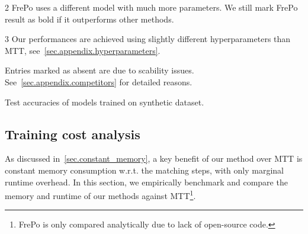 \documentclass[10pt,twocolumn,letterpaper]{article}
\begin{document}
\begin{table}
{\begin{threeparttable}
\begin{tablenotes}
    \item [2]FrePo uses a different model with much more parameters. We still mark FrePo result as bold if it outperforms other methods.
    \item[3] Our performances are achieved using slightly different hyperparameters than MTT, see~\cref{sec.appendix.hyperparameters}.
    \item Entries marked as absent are due to scability issues. See~\cref{sec.appendix.competitors} for detailed reasons.
    \end{tablenotes}
\end{threeparttable}
}
\caption{Test accuracies of models trained on synthetic dataset.}
\label{tab:overall_accuracy}
\end{table}
\subsection{Training cost analysis}
\label{sec.cost}
As discussed in~\cref{sec.constant_memory}, a key benefit of our method over MTT is constant memory consumption w.r.t. the matching steps, with only marginal runtime overhead. In this section, we empirically benchmark and compare the memory and runtime of our methods against MTT\footnote{FrePo is only compared analytically due to lack of open-source code.}.
\end{document}

